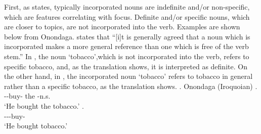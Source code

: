 First,
as  states,
typically incorporated nouns are {indefinite} and/or {non-specific},
which are features correlating with focus.
Definite and/or specific nouns, which are closer to topics,
are not incorporated into the verb.
Examples are shown below from Onondaga.
 states that
``[i]t is generally agreed that a noun which is incorporated makes a more general reference than one which is free of the verb stem.''
In \Next[a], the noun `tobacco',which is not incorporated into the verb,
refers to specific tobacco, and, as the translation shows,
it is interpreted as definite.
On the other hand, in \Next[b],
the incorporated noun `tobacco' refers to tobacco in general rather than a specific tobacco, as the translation shows.
%
\ex. Onondaga (Iroquoian)
 \ag.    \\
       --buy- the -n.s. \\
       `He bought the tobacco.'
 \bg.  \\
      ---buy- \\
      `He bought tobacco.'
      \hfill{\cite[10]{woodbury75a}}

